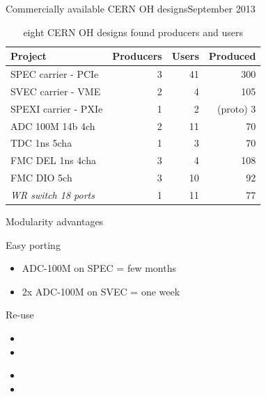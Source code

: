 \documentclass[compress,red]{beamer}
\begin{document}
\begin{frame}{Commercially available CERN OH designs}{September 2013}

  \begin{table}
    \centering

    \begin{tabular}{|l||r|r|r|}
      \hline
      Project & Producers & Users & Produced\\
      \hline\hline
      SPEC carrier - PCIe & 3 & 41 & 300 \\
      \hline
      SVEC carrier - VME & 2 & 4 & 105 \\
      \hline
      SPEXI carrier - PXIe & 1 & 2 & (proto) 3 \\
      \hline
      \hline
      ADC 100M 14b 4ch & 2 & 11 & 70 \\
      \hline
      TDC 1ns 5cha & 1 & 3 & 70 \\
      \hline
      FMC DEL 1ns 4cha & 3 & 4 & 108 \\
      \hline
      FMC DIO 5ch & 3 & 10 & 92 \\
      \hline
      \hline
      \textit{WR switch 18 ports} & 1 & 11 & 77\\
      \hline
    \end{tabular}

    \caption{eight CERN OH designs found producers and users}
  \end{table}

\end{frame}

\begin{frame}{Modularity advantages}

  \begin{block}{Easy porting}
    \begin{itemize}
    \item ADC-100M on SPEC = few months
    \item 2x ADC-100M on SVEC = one week
    \end{itemize}
  \end{block}

  \begin{block}{Re-use}
    \begin{itemize}
    \item 
    \item 
    \end{itemize}
  \end{block}

  \begin{block}{}
    \begin{itemize}
    \item 
    \item 
    \end{itemize}
  \end{block}

\end{frame}
\end{document}
